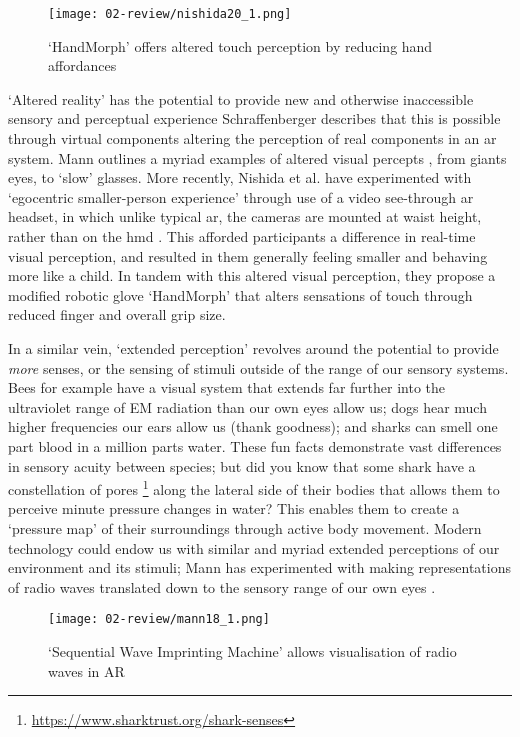 \begin{wrapfigure}{l}{0.45\textwidth}
    \begin{minipage}{0.95\linewidth}
        \texttt{[image: 02-review/nishida20\_1.png]}
        \captionsetup{justification=justified}
        \caption{`HandMorph' offers altered touch perception by reducing hand affordances \citep[in][]{nishida2020}}\label{fig: handmorph}
    \end{minipage}
    \hfill
\end{wrapfigure}
`Altered reality' has the potential to provide new and otherwise inaccessible sensory and perceptual experience Schraffenberger describes that this is possible through virtual components altering the perception of real components in an \gls{ar} system. Mann outlines a myriad examples of altered visual percepts \citeyearpar{mann1994}, from giants eyes, to `slow' glasses. More recently, Nishida et al. have experimented with `egocentric smaller-person experience' through use of a video see-through \gls{ar} headset, in which unlike typical \gls{ar}, the cameras are mounted at waist height, rather than on the \gls{hmd} \citeyearpar{nishida2019}. This afforded participants a difference in real-time visual perception, and resulted in them generally feeling smaller and behaving more like a child. In tandem with this altered visual perception, they propose a modified robotic glove `HandMorph' \citeyearpar{nishida2020} that alters sensations of touch through reduced finger and overall grip size. 

In a similar vein, `extended perception' revolves around the potential to provide \textit{more} senses, or the sensing of stimuli outside of the range of our sensory systems. Bees for example have a visual system that extends far further into the ultraviolet range of EM radiation than our own eyes allow us; dogs hear much higher frequencies our ears allow us (thank goodness); and sharks can smell one part blood in a million parts water. These fun facts demonstrate vast differences in sensory acuity between species; but did you know that some shark have a constellation of pores \footnote{\url{https://www.sharktrust.org/shark-senses}} along the lateral side of their bodies that allows them to perceive minute pressure changes in water? This enables them to create a `pressure map' of their surroundings through active body movement. Modern technology could endow us with similar and myriad extended perceptions of our environment and its stimuli; Mann has experimented with making representations of radio waves translated down to the sensory range of our own eyes \citeyearpar{mann2018a}.
\begin{wrapfigure}{r}{0.45\textwidth}
    \hfill
    \begin{minipage}{0.95\linewidth}
        \texttt{[image: 02-review/mann18\_1.png]}
        \captionsetup{justification=justified}
        \caption{`Sequential Wave Imprinting Machine' allows visualisation of radio waves in AR \citep[in][]{mann2018a}}\label{fig: mann_swim}
    \end{minipage}
\end{wrapfigure}

